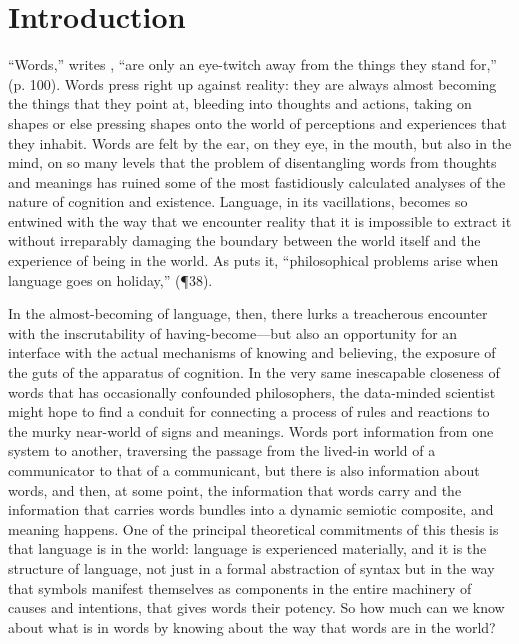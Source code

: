 \chapter{Introduction} \label{chap:intro}
``Words,'' writes \cite{Pynchon1973}, ``are only an eye-twitch away from the things they stand for,'' (p. 100).  Words press right up against reality: they are always almost becoming the things that they point at, bleeding into thoughts and actions, taking on shapes or else pressing shapes onto the world of perceptions and experiences that they inhabit.  Words are felt by the ear, on they eye, in the mouth, but also in the mind, on so many levels that the problem of disentangling words from thoughts and meanings has ruined some of the most fastidiously calculated analyses of the nature of cognition and existence.  Language, in its vacillations, becomes so entwined with the way that we encounter reality that it is impossible to extract it without irreparably damaging the boundary between the world itself and the experience of being in the world.  As \cite{Wittgenstein1953} puts it, ``philosophical problems arise when language goes on holiday,'' (\P 38).

In the almost-becoming of language, then, there lurks a treacherous encounter with the inscrutability of having-become---but also an opportunity for an interface with the actual mechanisms of knowing and believing, the exposure of the guts of the apparatus of cognition.  In the very same inescapable closeness of words that has occasionally confounded philosophers, the data-minded scientist might hope to find a conduit for connecting a process of rules and reactions to the murky near-world of signs and meanings.  Words port information from one system to another, traversing the passage from the lived-in world of a communicator to that of a communicant, but there is also information about words, and then, at some point, the information that words carry and the information that carries words bundles into a dynamic semiotic composite, and meaning happens.  One of the principal theoretical commitments of this thesis is that language is in the world: language is experienced materially, and it is the structure of language, not just in a formal abstraction of syntax but in the way that symbols manifest themselves as components in the entire machinery of causes and intentions, that gives words their potency.  So how much can we know about what is in words by knowing about the way that words are in the world?

